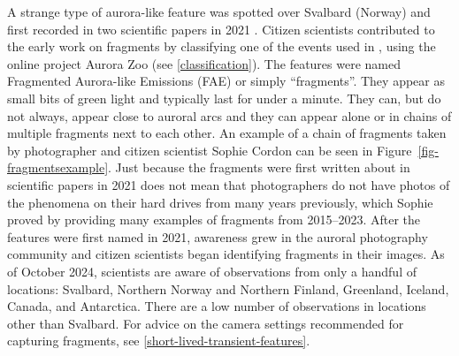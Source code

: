 \documentclass{article}
\renewcommand{\cite}[1]{\parencite{#1}}
\begin{document}
A strange type of aurora-like feature was spotted over Svalbard (Norway) and first recorded in two scientific papers in 2021 \cite{Dreyer2021, Whiter2021}. Citizen scientists contributed to the early work on fragments by classifying one of the events used in \textcite{Whiter2021}, using the online project Aurora Zoo (see \ref{classification}). The features were named Fragmented Aurora-like Emissions (FAE) or simply ``fragments''. They appear as small bits of green light and typically last for under a minute. They can, but do not always, appear close to auroral arcs and they can appear alone or in chains of multiple fragments next to each other. An example of a chain of fragments taken by photographer and citizen scientist Sophie Cordon can be seen in Figure~\ref{fig-fragmentsexample}. Just because the fragments were first written about in scientific papers in 2021 does not mean that photographers do not have photos of the phenomena on their hard drives from many years previously, which Sophie proved by providing many examples of fragments from 2015--2023.  After the features were first named in 2021, awareness grew in the auroral photography community and citizen scientists began identifying fragments in their images. As of October 2024, scientists are aware of observations from only a handful of locations: Svalbard, Northern Norway and Northern Finland, Greenland, Iceland, Canada, and Antarctica. There are a low number of observations in locations other than Svalbard. For advice on the camera settings recommended for capturing fragments, see \ref{short-lived-transient-features}.
\end{document}

